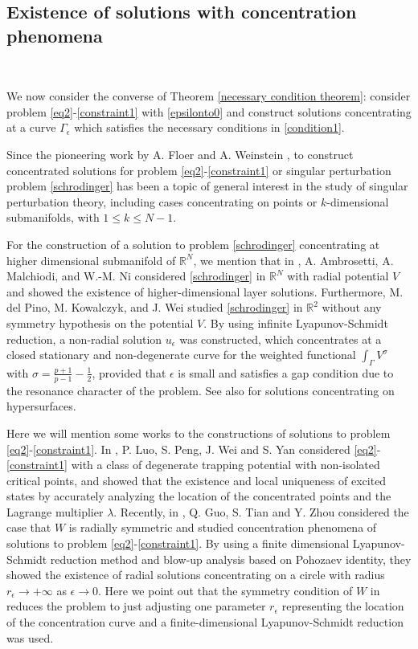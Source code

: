 \documentclass[10pt, reqno]{amsart}
\numberwithin{equation}{section}
\theoremstyle{definition}
\def\G{{\mathfrak G}}
\def\G{\Gamma}
\begin{document}
\smallskip
\subsection{ Existence of solutions with concentration phenomena}\


We now consider the converse of Theorem \ref{necessary condition theorem}: consider problem \eqref{eq2}-\eqref{constraint1} with \eqref{epsilonto0} and construct solutions concentrating at a curve $\G_\epsilon$ which satisfies the necessary conditions in \eqref{condition1}.

\smallskip
 Since the pioneering work by A. Floer and A. Weinstein \cite{FloerWein1986}, to construct concentrated solutions for problem \eqref{eq2}-\eqref{constraint1} or singular perturbation problem \eqref{schrodinger} has been a topic of general interest in the study of singular perturbation theory,
 including cases concentrating on points or $k$-dimensional submanifolds, with $ 1\leq k\leq N-1$.

\smallskip
For the construction of a solution to problem \eqref{schrodinger} concentrating at higher dimensional submanifold of ${\mathbb R}^N$,
we mention that in \cite{AMNconjecture1}, A. Ambrosetti, A. Malchiodi, and W.-M. Ni considered \eqref{schrodinger} in ${\mathbb R}^N$ with radial potential $V$ and showed the existence of higher-dimensional layer solutions.
Furthermore, M. del Pino, M. Kowalczyk, and J. Wei \cite{delPKowWei1} studied \eqref{schrodinger} in ${\mathbb R}^2$ without any symmetry hypothesis on the potential $V$.
By using infinite Lyapunov-Schmidt reduction, a non-radial solution $u_\epsilon$ was constructed, which concentrates at a closed stationary and non-degenerate curve for the weighted functional $\int_\Gamma V^\sigma$ with $\sigma = \frac{p+1} {p-1}- \frac 12$,
provided that $\epsilon$ is small and satisfies a gap condition due to the resonance character of the problem.
See also \cite{WangWeiYang} for solutions concentrating on hypersurfaces.


\smallskip
Here we will mention some works to the constructions of solutions to problem \eqref{eq2}-\eqref{constraint1}.
In \cite{Luo}, P. Luo, S. Peng, J. Wei and S. Yan considered \eqref{eq2}-\eqref{constraint1} with a class of degenerate trapping potential with non-isolated critical points,
and showed that the existence and local uniqueness of excited states by accurately analyzing the location of the concentrated points and the Lagrange multiplier $\lambda$.
Recently, in \cite{Zhouyang}, Q. Guo, S. Tian and Y. Zhou considered the case that $W$ is radially symmetric and studied concentration phenomena of solutions to problem \eqref{eq2}-\eqref{constraint1}.
By using a finite dimensional Lyapunov-Schmidt reduction method and blow-up analysis based on Pohozaev identity, they showed the existence of radial solutions concentrating on a circle with radius $r_\epsilon \to +\infty$ as $\epsilon \to 0$.
Here we point out that the symmetry condition of $W$ in \cite{Zhouyang} reduces the problem to just adjusting one parameter $r_\epsilon$ representing the location of the concentration curve and a finite-dimensional Lyapunov-Schmidt reduction was used.
\end{document}
